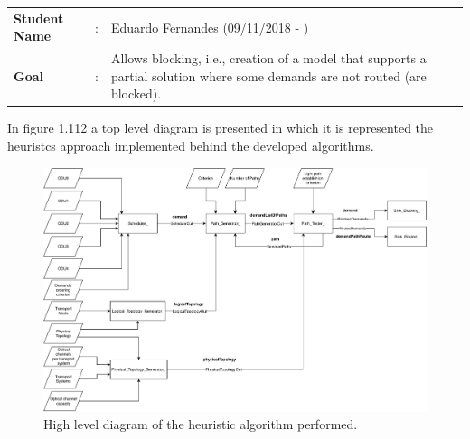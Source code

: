 \begin{tcolorbox}	
	\begin{tabular}{p{2.75cm} p{0.2cm} p{10.5cm}} 	
		\textbf{Student Name}   &:& Eduardo Fernandes    (09/11/2018 - )\\
		\textbf{Goal}           &:& Allows blocking, i.e., creation of a model that supports a partial solution where some demands are not routed (are blocked).
	\end{tabular}
\end{tcolorbox}

 \vspace{11pt}
 In figure 1.112 a top level diagram is presented in which it is represented the heuristcs approach implemented behind the developed algorithms. %

\begin{figure}[H]
	\centering
	\includegraphics[width=15cm]{sdf/heuristic/transparent/figures/fluxogramaSemGroomingHighLevel}
	\caption{High level diagram of the heuristic algorithm performed.}
	\label{fluxogram_transparent_surv}
\end{figure}

